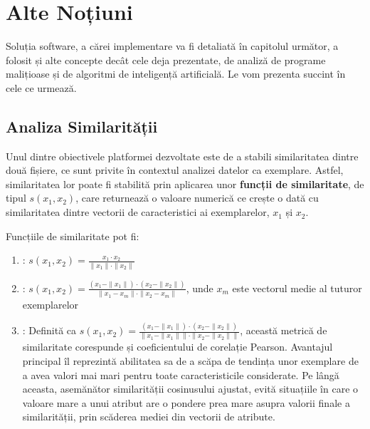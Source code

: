 \documentclass[../../main.tex]{subfiles}
\begin{document}
\section{Alte Noțiuni}
\label{sec:theory_misc}

Soluția software, a cărei implementare va fi detaliată în capitolul următor, a folosit și alte concepte decât cele deja prezentate, de analiză de programe malițioase și de algoritmi de inteligență artificială. Le vom prezenta succint în cele ce urmează.

\subsection{Analiza Similarității}

Unul dintre obiectivele platformei dezvoltate este de a stabili similaritatea dintre două fișiere, ce sunt privite în contextul analizei datelor ca exemplare. Astfel, similaritatea lor poate fi stabilită prin aplicarea unor \textbf{funcții de similaritate}, de tipul $ s(x_1, x_2) $, care returnează o valoare numerică ce crește o dată cu similaritatea dintre vectorii de caracteristici ai exemplarelor, $ x_1 $ și $ x_2 $.

Funcțiile de similaritate pot fi:

\begin{enumerate}
    \item {}: $ s(x_1, x_2) = \frac{x_1 \cdot x_2}{\parallel x_1 \parallel \cdot \parallel x_2 \parallel} $
    \item {}: $ s(x_1, x_2) = \frac{(x_1 - \parallel x_1 \parallel) \cdot (x_2 - \parallel x_2 \parallel)}{\parallel x_1 - x_m \parallel \cdot \parallel x_2 - x_m \parallel} $, unde $ x_m $ este vectorul medie al tuturor exemplarelor
    \item {}: Definită ca $ s(x_1, x_2) = \frac{(x_1 - \parallel x_1 \parallel) \cdot (x_2 - \parallel x_2 \parallel)}{\parallel x_1 - \parallel x_1 \parallel \parallel \cdot \parallel x_2 - \parallel x_2 \parallel \parallel} $, această metrică de similaritate corespunde și coeficientului de corelație Pearson. Avantajul principal îl reprezintă abilitatea sa de a scăpa de tendința unor exemplare de a avea valori mai mari pentru toate caracteristicile considerate. Pe lângă aceasta, asemănător similarității cosinusului ajustat, evită situațiile în care o valoare mare a unui atribut are o pondere prea mare asupra valorii finale a similarității, prin scăderea mediei din vectorii de atribute.
\end{enumerate}
\end{document}
